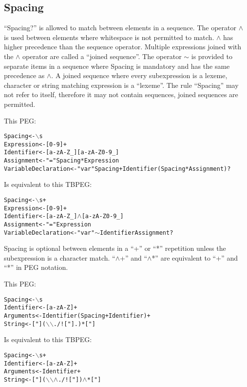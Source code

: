 \documentclass[a4paper,11pt]{article}
\begin{document}
\subsection{Spacing}
``Spacing?'' is allowed to match between elements in a sequence.
The operator $\wedge$ is used between elements where whitespace is not permitted to match.
$\wedge$ has higher precedence than the sequence operator.
Multiple expressions joined with the $\wedge$ operator are called a ``joined sequence''.
The operator $\sim$ is provided to separate items in a sequence where Spacing is mandatory and has the same precedence as $\wedge$.
A joined sequence where every subexpression is a lexeme, character or string matching expression is a ``lexeme''.
The rule ``Spacing'' may not refer to itself, therefore it may not contain sequences, joined sequences are permitted.

This PEG:
\begin{alltt}
    Spacing             <- \(\backslash\)s
    Expression          <- [0-9]+
    Identifier          <- [a-zA-Z\_][a-zA-Z0-9\_]
    Assignment          <- "=" Spacing* Expression
    VariableDeclaration <- "var" Spacing+ Identifier (Spacing* Assignment)?
\end{alltt}

Is equivalent to this TBPEG:
\begin{alltt}
    Spacing             <- \(\backslash\)s+
    Expression          <- [0-9]+
    Identifier          <- [a-zA-Z\_] \(\wedge\) [a-zA-Z0-9\_]
    Assignment          <- "=" Expression
    VariableDeclaration <- "var" \(\sim\) Identifier Assignment?
\end{alltt}

Spacing is optional between elements in a ``+'' or ``*'' repetition unless the subexpression is a character match.
``$\wedge$+'' and ``$\wedge$*'' are equivalent to ``+'' and ``*'' in PEG notation.

This PEG:
\begin{alltt}
    Spacing    <- \(\backslash\)s
    Identifier <- [a-zA-Z]+
    Arguments  <- Identifier (Spacing+ Identifier)+
    String     <- ["] (\(\backslash\)\(\backslash\). / ! ["] .)* ["]
\end{alltt}

Is equivalent to this TBPEG:
\begin{alltt}
    Spacing    <- \(\backslash\)s+
    Identifier <- [a-zA-Z]+
    Arguments  <- Identifier+
    String     <- ["] (\(\backslash\)\(\backslash\) \(\wedge\) . / ! ["] )\(\wedge\)* ["]
\end{alltt}
\end{document}
